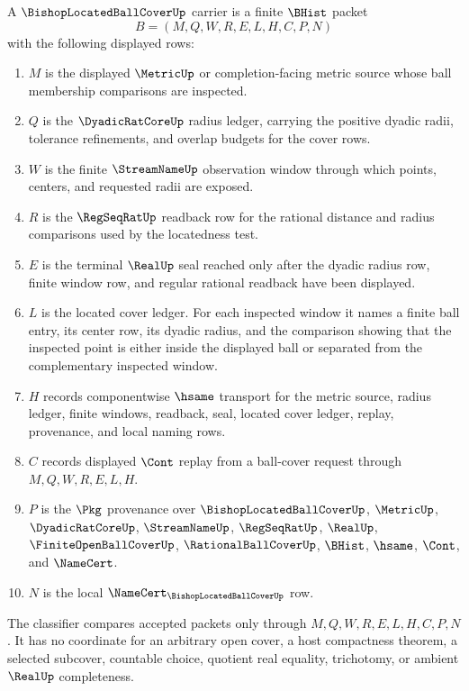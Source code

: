 \begin{definition}
\label{def:bishop-located-ball-cover-carrier}
A $\BishopLocatedBallCoverUp$ carrier is a finite $\BHist$ packet
$$
B=(M,Q,W,R,E,L,H,C,P,N)
$$
with the following displayed rows:
\begin{enumerate}
\item $M$ is the displayed $\MetricUp$ or completion-facing metric source whose ball membership comparisons are inspected.
\item $Q$ is the $\DyadicRatCoreUp$ radius ledger, carrying the positive dyadic radii, tolerance refinements, and overlap budgets for the cover rows.
\item $W$ is the finite $\StreamNameUp$ observation window through which points, centers, and requested radii are exposed.
\item $R$ is the $\RegSeqRatUp$ readback row for the rational distance and radius comparisons used by the locatedness test.
\item $E$ is the terminal $\RealUp$ seal reached only after the dyadic radius row, finite window row, and regular rational readback have been displayed.
\item $L$ is the located cover ledger. For each inspected window it names a finite ball entry, its center row, its dyadic radius, and the comparison showing that the inspected point is either inside the displayed ball or separated from the complementary inspected window.
\item $H$ records componentwise $\hsame$ transport for the metric source, radius ledger, finite windows, readback, seal, located cover ledger, replay, provenance, and local naming rows.
\item $C$ records displayed $\Cont$ replay from a ball-cover request through $M,Q,W,R,E,L,H$.
\item $P$ is the $\Pkg$ provenance over $\BishopLocatedBallCoverUp$, $\MetricUp$, $\DyadicRatCoreUp$, $\StreamNameUp$, $\RegSeqRatUp$, $\RealUp$, $\FiniteOpenBallCoverUp$, $\RationalBallCoverUp$, $\BHist$, $\hsame$, $\Cont$, and $\NameCert$.
\item $N$ is the local $\NameCert_{\BishopLocatedBallCoverUp}$ row.
\end{enumerate}
The classifier compares accepted packets only through $M,Q,W,R,E,L,H,C,P,N$. It has no coordinate for an arbitrary open cover, a host compactness theorem, a selected subcover, countable choice, quotient real equality, trichotomy, or ambient $\RealUp$ completeness.
\end{definition}

